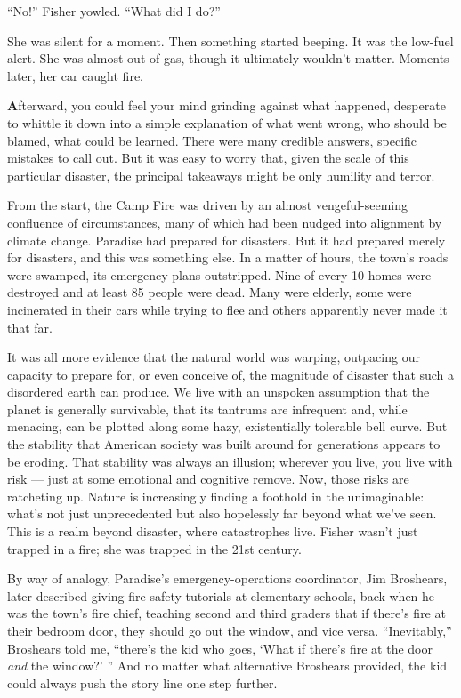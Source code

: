``No!'' Fisher yowled. ``What did I do?''

She was silent for a moment. Then something started beeping. It was the
low-fuel alert. She was almost out of gas, though it ultimately wouldn't
matter. Moments later, her car caught fire.

\textbf{A}fterward, you could feel your mind grinding against what
happened, desperate to whittle it down into a simple explanation of what
went wrong, who should be blamed, what could be learned. There were many
credible answers, specific mistakes to call out. But it was easy to
worry that, given the scale of this particular disaster, the principal
takeaways might be only humility and terror.

From the start, the Camp Fire was driven by an almost vengeful-seeming
confluence of circumstances, many of which had been nudged into
alignment by climate change. Paradise had prepared for disasters. But it
had prepared merely for disasters, and this was something else. In a
matter of hours, the town's roads were swamped, its emergency plans
outstripped. Nine of every 10 homes were destroyed and at least 85
people were dead. Many were elderly, some were incinerated in their cars
while trying to flee and others apparently never made it that far.

It was all more evidence that the natural world was warping, outpacing
our capacity to prepare for, or even conceive of, the magnitude of
disaster that such a disordered earth can produce. We live with an
unspoken assumption that the planet is generally survivable, that its
tantrums are infrequent and, while menacing, can be plotted along some
hazy, existentially tolerable bell curve. But the stability that
American society was built around for generations appears to be eroding.
That stability was always an illusion; wherever you live, you live with
risk --- just at some emotional and cognitive remove. Now, those risks
are ratcheting up. Nature is increasingly finding a foothold in the
unimaginable: what's not just unprecedented but also hopelessly far
beyond what we've seen. This is a realm beyond disaster, where
catastrophes live. Fisher wasn't just trapped in a fire; she was trapped
in the 21st century.

By way of analogy, Paradise's emergency-operations coordinator, Jim
Broshears, later described giving fire-safety tutorials at elementary
schools, back when he was the town's fire chief, teaching second and
third graders that if there's fire at their bedroom door, they should go
out the window, and vice versa. ``Inevitably,'' Broshears told me,
``there's the kid who goes, `What if there's fire at the door \emph{and}
the window?' '' And no matter what alternative Broshears provided, the
kid could always push the story line one step further.

